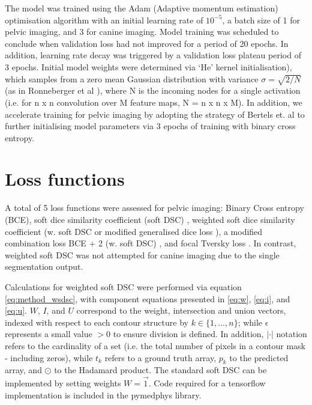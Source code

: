 The model was trained using the Adam (Adaptive momentum estimation) optimisation algorithm \cite{kingma2014} with an initial learning rate of $10^{-5}$, a batch size of 1 for pelvic imaging, and 3 for canine imaging. Model training was scheduled to conclude when validation loss had not improved for a period of 20 epochs. In addition, learning rate decay was triggered by a validation loss plateau period of 3 epochs. Initial model weights were determined via `He' kernel initialisation), which samples from a zero mean Gaussian distribution with variance $\sigma=\sqrt{2/N}$ (as in Ronneberger et al \cite{Ronneberger_2015}), where N is the incoming nodes for a single activation (i.e. for n x n convolution over M feature maps, N = n x n x M). In addition, we accelerate training for pelvic imaging by adopting the strategy of Bertels et. al to further initialising model parameters via 3 epochs of training with binary cross entropy.



\section{Loss functions}
\label{ch:method-loss}
A total of 5 loss functions were assessed for pelvic imaging: Binary Cross entropy (BCE), soft dice similarity coefficient (soft DSC) \cite{Bertels2019},
weighted soft dice similarity coefficient (w. soft DSC or modified generalised dice loss \cite{Sudre_2017}), a modified combination loss BCE + 2 (w. soft DSC) \cite{taghanaki2018}, and focal Tversky loss \cite{Zhu_2018, Khan2019, abraham2018}. In contrast, weighted soft DSC was not attempted for canine imaging due to the single segmentation output.

Calculations for weighted soft DSC were performed via equation \ref{eq:method_wsdsc}, with component equations presented in \ref{eq:w}, \ref{eq:i}, and \ref{eq:u}. $W$, $I$, and $U$ correspond to the weight, intersection and union vectors, indexed with respect to each contour structure by $k\in\{1,...,n\}$; while $\epsilon$ represents a small value $>0$ to ensure division is defined. In addition, $|\cdot|$ notation refers to the cardinality of a set (i.e. the total number of pixels in a contour mask - including zeros), while $t_{k}$ refers to a ground truth array, $p_{k}$ to the predicted array, and $\odot$ to the Hadamard product. The standard soft DSC can be implemented by setting weights $W=\vec{1}$.  Code required for a tensorflow
implementation is included in the pymedphys
library.

